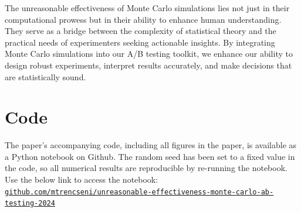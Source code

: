 \documentclass[final,5p,times,twocolumn,authoryear]{elsarticle}
\begin{document}
The unreasonable effectiveness of Monte Carlo simulations lies not just in their computational prowess but in their ability to enhance human understanding. They serve as a bridge between the complexity of statistical theory and the practical needs of experimenters seeking actionable insights. By integrating Monte Carlo simulations into our A/B testing toolkit, we enhance our ability to design robust experiments, interpret results accurately, and make decisions that are statistically sound. 

\section{Code}

The paper's accompanying code, including all figures in the paper, is available as a Python notebook on Github. The random seed has been set to a fixed value in the code, so all numerical results are reproducible by re-running the notebook. Use the below link to access the notebook:
\href{https://github.com/mtrencseni/unreasonable-effectiveness-monte-carlo-ab-testing-2024}{\texttt{{\ssmall github.com/mtrencseni/unreasonable-effectiveness-monte-carlo-ab-testing-2024}}}

 
\end{document}
